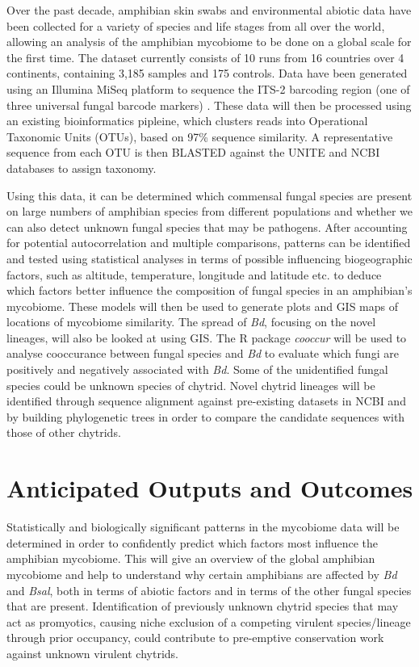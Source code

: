 \documentclass[11pt, a4paper, titlepage]{article}
\begin{document}
Over the past decade, amphibian skin swabs and environmental abiotic data have been collected for a variety of species and life stages from all over the world, allowing an analysis of the amphibian mycobiome to be done on a global scale for the first time. The dataset currently consists of 10 runs from 16 countries over 4 continents, containing 3,185 samples and 175 controls. Data have been generated using an Illumina MiSeq platform to sequence the ITS-2 barcoding region (one of three universal fungal barcode markers) \parencite{Schoch2012}. These data will then be processed using an existing bioinformatics pipleine, which clusters reads into Operational Taxonomic Units (OTUs), based on 97\% sequence similarity. A representative sequence from each OTU is then BLASTED against the UNITE and NCBI databases to assign taxonomy. 

\noindent Using this data, it can be determined which commensal fungal species are present on large numbers of amphibian species from different populations and whether we can also detect unknown fungal species that may be pathogens. After accounting for potential autocorrelation and multiple comparisons, patterns can be identified and tested using statistical analyses in terms of possible influencing biogeographic factors, such as altitude, temperature, longitude and latitude etc. to deduce which factors better influence the composition of fungal species in an amphibian's mycobiome. These models will then be used to generate plots and GIS maps of locations of mycobiome similarity. The spread of \textit{Bd}, focusing on the novel lineages, will also be looked at using GIS. The R package \textit{cooccur} \parencite{RCooccur} will be used to analyse cooccurance between fungal species and \textit{Bd} to evaluate which fungi are positively and negatively associated with \textit{Bd}. Some of the unidentified fungal species could be unknown species of chytrid. Novel chytrid lineages will be identified through sequence alignment against pre-existing datasets in NCBI and by building phylogenetic trees in order to compare the candidate sequences with those of other chytrids. 

\section{Anticipated Outputs and Outcomes}

Statistically and biologically significant patterns in the mycobiome data will be determined in order to confidently predict which factors most influence the amphibian mycobiome. This will give an overview of the global amphibian mycobiome and help to understand why certain amphibians are affected by \textit{Bd} and \textit{Bsal}, both in terms of abiotic factors and in terms of the other fungal species that are present. Identification of previously unknown chytrid species that may act as promyotics, causing niche exclusion of a competing virulent species/lineage through prior occupancy, could contribute to pre-emptive conservation work against unknown virulent chytrids.
\end{document}
